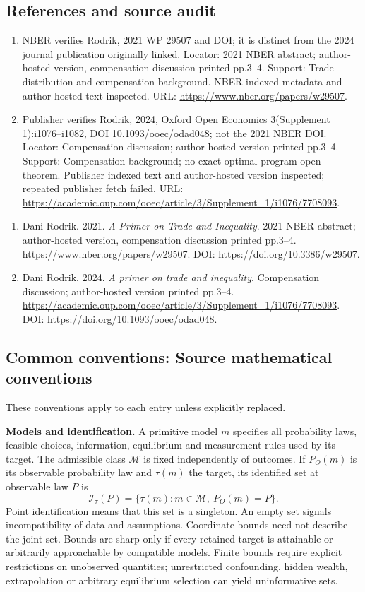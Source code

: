 \documentclass[11pt,a4paper]{article}
\begin{document}
\subsection*{References and source audit}
\begin{enumerate}
\item NBER verifies Rodrik, 2021 WP 29507 and DOI; it is distinct from the 2024 journal publication originally linked. Locator: 2021 NBER abstract; author-hosted version, compensation discussion printed pp.3--4. Support: Trade-distribution and compensation background. NBER indexed metadata and author-hosted text inspected. URL: \url{https://www.nber.org/papers/w29507}.
\item Publisher verifies Rodrik, 2024, Oxford Open Economics 3(Supplement 1):i1076--i1082, DOI 10.1093/ooec/odad048; not the 2021 NBER DOI. Locator: Compensation discussion; author-hosted version printed pp.3--4. Support: Compensation background; no exact optimal-program open theorem. Publisher indexed text and author-hosted version inspected; repeated publisher fetch failed. URL: \url{https://academic.oup.com/ooec/article/3/Supplement_1/i1076/7708093}.
\end{enumerate}
\begin{enumerate}\raggedright
\item\hypertarget{definitions:source:30007623:1}{} Dani Rodrik. 2021. \emph{A Primer on Trade and Inequality}. 2021 NBER abstract; author-hosted version, compensation discussion printed pp.3--4.
\url{https://www.nber.org/papers/w29507}.
DOI: \url{https://doi.org/10.3386/w29507}.
\item\hypertarget{definitions:source:30007623:2}{} Dani Rodrik. 2024. \emph{A primer on trade and inequality}. Compensation discussion; author-hosted version printed pp.3--4.
\url{https://academic.oup.com/ooec/article/3/Supplement_1/i1076/7708093}.
DOI: \url{https://doi.org/10.1093/ooec/odad048}.
\end{enumerate}

\subsection*{Common conventions: Source mathematical conventions}

These conventions apply to each entry unless explicitly replaced.

\textbf{Models and identification.} A primitive model \(m\) specifies all probability laws, feasible choices, information, equilibrium and measurement rules used by its target. The admissible class \(\mathcal M\) is fixed independently of outcomes. If \(P_O(m)\) is its observable probability law and \(\tau(m)\) the target, its identified set at observable law \(P\) is
\[
 \mathcal I_\tau(P)=\{\tau(m):m\in\mathcal M,\ P_O(m)=P\}.
\]
Point identification means that this set is a singleton. An empty set signals incompatibility of data and assumptions. Coordinate bounds need not describe the joint set. Bounds are sharp only if every retained target is attainable or arbitrarily approachable by compatible models. Finite bounds require explicit restrictions on unobserved quantities; unrestricted confounding, hidden wealth, extrapolation or arbitrary equilibrium selection can yield uninformative sets.
\end{document}
